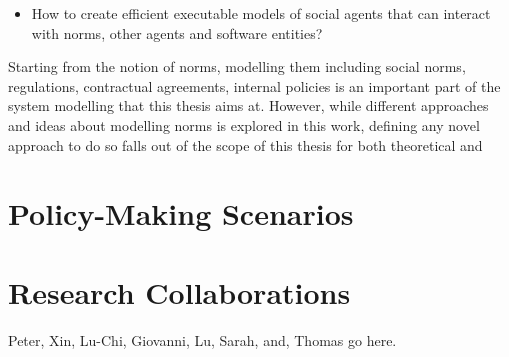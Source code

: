 \begin{itemize}
    \item How to create efficient executable models of social agents that can interact with norms, other agents and software entities?
\end{itemize}

Starting from the notion of norms, modelling them including social norms, regulations, contractual agreements, internal policies is an important part of the system modelling that this thesis aims at. However, while different approaches and ideas about modelling norms is explored in this work, defining any novel approach to do so falls out of the scope of this thesis for both theoretical and 




\section{Policy-Making Scenarios}


\section{Research Collaborations}
Peter, Xin, Lu-Chi, Giovanni, Lu, Sarah, and, Thomas go here.